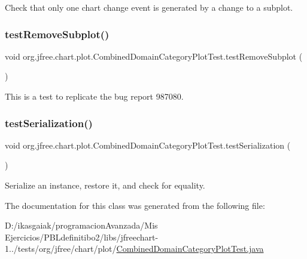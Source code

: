 Check that only one chart change event is generated by a change to a subplot. \mbox{\label{classorg_1_1jfree_1_1chart_1_1plot_1_1_combined_domain_category_plot_test_a1f3add7349c8fd0dda9eb69f0281e6bf}} 
\subsubsection{\texorpdfstring{test\+Remove\+Subplot()}{testRemoveSubplot()}}
{\footnotesize\ttfamily void org.\+jfree.\+chart.\+plot.\+Combined\+Domain\+Category\+Plot\+Test.\+test\+Remove\+Subplot (\begin{DoxyParamCaption}{ }\end{DoxyParamCaption})}

This is a test to replicate the bug report 987080. \mbox{\label{classorg_1_1jfree_1_1chart_1_1plot_1_1_combined_domain_category_plot_test_a273b03f82a07f13e3e7a1ec421b5c201}} 
\subsubsection{\texorpdfstring{test\+Serialization()}{testSerialization()}}
{\footnotesize\ttfamily void org.\+jfree.\+chart.\+plot.\+Combined\+Domain\+Category\+Plot\+Test.\+test\+Serialization (\begin{DoxyParamCaption}{ }\end{DoxyParamCaption})}

Serialize an instance, restore it, and check for equality. 

The documentation for this class was generated from the following file\+:\begin{DoxyCompactItemize}
\item 
D\+:/ikasgaiak/programacion\+Avanzada/\+Mis Ejercicios/\+P\+B\+Ldefinitibo2/libs/jfreechart-\/1../tests/org/jfree/chart/plot/\mbox{\hyperlink{_combined_domain_category_plot_test_8java}{Combined\+Domain\+Category\+Plot\+Test.\+java}}\end{DoxyCompactItemize}

